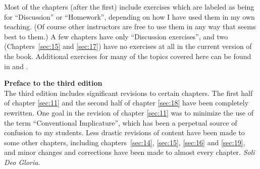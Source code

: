 \begin{refsection}
Most of the chapters (after the first) include exercises which are labeled as being for “Discussion” or “Homework”, depending on how I have used them in my own teaching. (Of course other instructors are free to use them in any way that seems best to them.) A few chapters have only “Discussion exercises”, and two (Chapters~\ref{sec:15} and \ref{sec:17}) have no exercises at all in the current version of the book. Additional exercises for many of the topics covered here can be found in \citet{Saeed2009} and \citet{Kearns2000}.

\bigskip
\noindent \textbf{Preface to the third edition}\\

The third edition includes significant revisions to certain chapters. The first half of chapter \ref{sec:11} and the second half of chapter \ref{sec:18} have been completely rewritten. One goal in the revision of chapter \ref{sec:11} was to minimize the use of the term “Conventional Implicature”, which has been a perpetual source of confusion to my students. Less drastic revisions of content have been made to some other chapters, including chapters~\ref{sec:14}, \ref{sec:15}, \ref{sec:16} and \ref{sec:19}, and minor changes and corrections have been made to almost every chapter. \textit{Soli Deo Gloria}.


\printbibliography[heading=subbibliography]
\end{refsection}